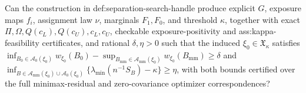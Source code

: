 Can the construction in def:separation-search-handle produce explicit \(G\), exposure maps \(f_i\), assignment law \(\nu\), marginals \(F_1,F_0\), and threshold \(\kappa\), together with exact \(\Pi,\Omega,Q(c_L),Q(c_U),c_L,c_U\), checkable exposure-positivity and ass:kappa-feasibility certificates, and rational \(\delta,\eta>0\) such that the induced \(\xi_0\in\mathfrak X_\kappa\) satisfies \(\inf_{B_0\in\mathcal A_0(\xi_0)}w_{\xi_0}(B_0)-\sup_{B_{\mathrm{mm}}\in\mathcal A_{\mathrm{mm}}(\xi_0)}w_{\xi_0}(B_{\mathrm{mm}})\ge\delta\) and \(\inf_{B\in\mathcal A_{\mathrm{mm}}(\xi_0)\cup\mathcal A_0(\xi_0)}\{\lambda_{\min}(n^{-1}S_B)-\kappa\}\ge\eta\), with both bounds certified over the full minimax-residual and zero-covariance optimizer correspondences?